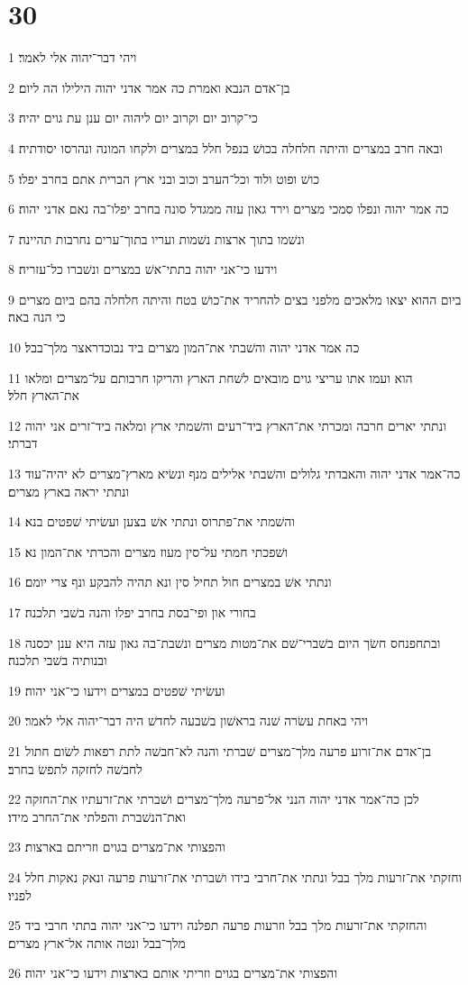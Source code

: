 \chapter{30}

\par 1 ויהי דבר־יהוה אלי לאמר׃
\par 2 בן־אדם הנבא ואמרת כה אמר אדני יהוה הילילו הה ליום׃
\par 3 כי־קרוב יום וקרוב יום ליהוה יום ענן עת גוים יהיה׃
\par 4 ובאה חרב במצרים והיתה חלחלה בכושׁ בנפל חלל במצרים ולקחו המונה ונהרסו יסודתיה׃
\par 5 כושׁ ופוט ולוד וכל־הערב וכוב ובני ארץ הברית אתם בחרב יפלו׃
\par 6 כה אמר יהוה ונפלו סמכי מצרים וירד גאון עזה ממגדל סונה בחרב יפלו־בה נאם אדני יהוה׃
\par 7 ונשׁמו בתוך ארצות נשׁמות ועריו בתוך־ערים נחרבות תהיינה׃
\par 8 וידעו כי־אני יהוה בתתי־אשׁ במצרים ונשׁברו כל־עזריה׃
\par 9 ביום ההוא יצאו מלאכים מלפני בצים להחריד את־כושׁ בטח והיתה חלחלה בהם ביום מצרים כי הנה באה׃
\par 10 כה אמר אדני יהוה והשׁבתי את־המון מצרים ביד נבוכדראצר מלך־בבל׃
\par 11 הוא ועמו אתו עריצי גוים מובאים לשׁחת הארץ והריקו חרבותם על־מצרים ומלאו את־הארץ חלל׃
\par 12 ונתתי יארים חרבה ומכרתי את־הארץ ביד־רעים והשׁמתי ארץ ומלאה ביד־זרים אני יהוה דברתי׃
\par 13 כה־אמר אדני יהוה והאבדתי גלולים והשׁבתי אלילים מנף ונשׂיא מארץ־מצרים לא יהיה־עוד ונתתי יראה בארץ מצרים׃
\par 14 והשׁמתי את־פתרוס ונתתי אשׁ בצען ועשׂיתי שׁפטים בנא׃
\par 15 ושׁפכתי חמתי על־סין מעוז מצרים והכרתי את־המון נא׃
\par 16 ונתתי אשׁ במצרים חול תחיל סין ונא תהיה להבקע ונף צרי יומם׃
\par 17 בחורי און ופי־בסת בחרב יפלו והנה בשׁבי תלכנה׃
\par 18 ובתחפנחס חשׂך היום בשׁברי־שׁם את־מטות מצרים ונשׁבת־בה גאון עזה היא ענן יכסנה ובנותיה בשׁבי תלכנה׃
\par 19 ועשׂיתי שׁפטים במצרים וידעו כי־אני יהוה׃
\par 20 ויהי באחת עשׂרה שׁנה בראשׁון בשׁבעה לחדשׁ היה דבר־יהוה אלי לאמר׃
\par 21 בן־אדם את־זרוע פרעה מלך־מצרים שׁברתי והנה לא־חבשׁה לתת רפאות לשׂום חתול לחבשׁה לחזקה לתפשׂ בחרב׃
\par 22 לכן כה־אמר אדני יהוה הנני אל־פרעה מלך־מצרים ושׁברתי את־זרעתיו את־החזקה ואת־הנשׁברת והפלתי את־החרב מידו׃
\par 23 והפצותי את־מצרים בגוים וזריתם בארצות׃
\par 24 וחזקתי את־זרעות מלך בבל ונתתי את־חרבי בידו ושׁברתי את־זרעות פרעה ונאק נאקות חלל לפניו׃
\par 25 והחזקתי את־זרעות מלך בבל וזרעות פרעה תפלנה וידעו כי־אני יהוה בתתי חרבי ביד מלך־בבל ונטה אותה אל־ארץ מצרים׃
\par 26 והפצותי את־מצרים בגוים וזריתי אותם בארצות וידעו כי־אני יהוה׃

